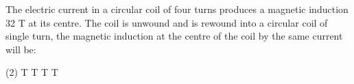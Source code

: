 \item The electric current in a circular coil of four turns produces a magnetic induction 32 T at its centre. The coil is unwound and is rewound into a circular coil of single turn, the magnetic induction at the centre of the coil by the same current will be:
\begin{tasks}(2)
     T
     T
     T
     T
\end{tasks}